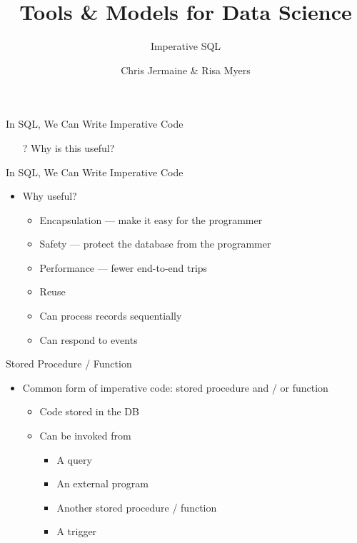 \documentclass[aspectratio=169]{beamer}
\title[]
{Tools \& Models for Data Science}
\subtitle{Imperative SQL}
\author[]{Chris Jermaine \& Risa Myers}
\institute
{
  Rice University 
}
\date[]{}
\begin{document}
\begin{frame}
 \titlepage
\end{frame}



\begin{frame}{In SQL, We Can Write Imperative Code}

\begin{itemize}
\item[?] Why is this useful?
\end{itemize}
\end{frame}
\begin{frame}{In SQL, We Can Write Imperative Code}

\begin{itemize}
\item Why useful?
	\begin{itemize}
		\item Encapsulation --- make it easy for the programmer
		\item Safety --- protect the database from the programmer
		\item Performance --- fewer end-to-end trips
		\item Reuse
		\item Can process records sequentially
		\item Can respond to events
	\end{itemize}
\end{itemize}
\end{frame}

\begin{frame}{Stored Procedure / Function}

\begin{itemize}
\item Common form of imperative code: stored procedure and / or function 
	\begin{itemize}
	\item Code stored in the DB
	\item Can be invoked from
	\begin{itemize}
	\item A query
	\item An external program
	\item Another stored procedure / function
	\item A trigger
	\end{itemize}
	\end{itemize}
\end{itemize}
\end{frame}
\end{document}
